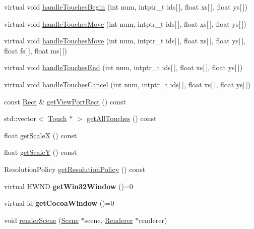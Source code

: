 \begin{DoxyCompactItemize}
virtual void \hyperlink{classGLView_a0db8bb472b496eda8861c39cb5bab43d}{handle\+Touches\+Begin} (int num, intptr\+\_\+t ids\mbox{[}$\,$\mbox{]}, float xs\mbox{[}$\,$\mbox{]}, float ys\mbox{[}$\,$\mbox{]})
\item 
virtual void \hyperlink{classGLView_a11f47e82b25f84dd0f976872cad038c4}{handle\+Touches\+Move} (int num, intptr\+\_\+t ids\mbox{[}$\,$\mbox{]}, float xs\mbox{[}$\,$\mbox{]}, float ys\mbox{[}$\,$\mbox{]})
\item 
virtual void \hyperlink{classGLView_ac5aca8c81bcd8297cb35c0dec74598ce}{handle\+Touches\+Move} (int num, intptr\+\_\+t ids\mbox{[}$\,$\mbox{]}, float xs\mbox{[}$\,$\mbox{]}, float ys\mbox{[}$\,$\mbox{]}, float fs\mbox{[}$\,$\mbox{]}, float ms\mbox{[}$\,$\mbox{]})
\item 
virtual void \hyperlink{classGLView_ac92c6ff5d59d28571cb20af5df29c12d}{handle\+Touches\+End} (int num, intptr\+\_\+t ids\mbox{[}$\,$\mbox{]}, float xs\mbox{[}$\,$\mbox{]}, float ys\mbox{[}$\,$\mbox{]})
\item 
virtual void \hyperlink{classGLView_afcf8388182be3b40e51d3d1526722038}{handle\+Touches\+Cancel} (int num, intptr\+\_\+t ids\mbox{[}$\,$\mbox{]}, float xs\mbox{[}$\,$\mbox{]}, float ys\mbox{[}$\,$\mbox{]})
\item 
const \hyperlink{classRect}{Rect} \& \hyperlink{classGLView_a8372ba3ae530fbf428cda94ba20b18fb}{get\+View\+Port\+Rect} () const
\item 
std\+::vector$<$ \hyperlink{classTouch}{Touch} $\ast$ $>$ \hyperlink{classGLView_ac66a21bfd3605354ebc3aecd6cfd85ed}{get\+All\+Touches} () const
\item 
float \hyperlink{classGLView_a98f6226c66f3614d21f61ed844ed28bb}{get\+ScaleX} () const
\item 
float \hyperlink{classGLView_a3ee3994af139859a58568ccf3ba85aa6}{get\+ScaleY} () const
\item 
Resolution\+Policy \hyperlink{classGLView_a826c04e9fc58895b6a7d95ba68ac1ba1}{get\+Resolution\+Policy} () const
\item 
\mbox{\label{classGLView_aa143334d2fcc5beebc75f3216d91e3bd}} 
virtual H\+W\+ND {\bfseries get\+Win32\+Window} ()=0
\item 
\mbox{\label{classGLView_a6b457d77ae8c3cf0b400d0921d7a3ee8}} 
virtual id {\bfseries get\+Cocoa\+Window} ()=0
\item 
void \hyperlink{classGLView_a47d30a4a1d8ed5f7a1556c456a5af74f}{render\+Scene} (\hyperlink{classScene}{Scene} $\ast$scene, \hyperlink{classRenderer}{Renderer} $\ast$renderer)

\end{DoxyCompactItemize}
